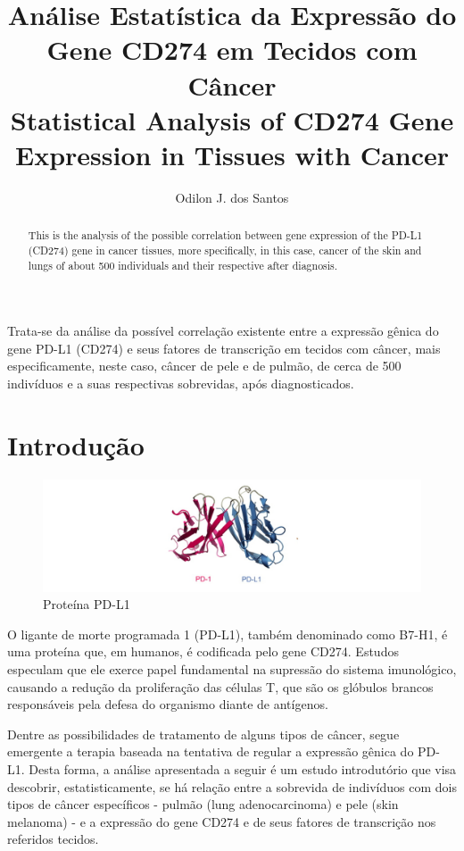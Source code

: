 \documentclass[a4paper,12pt]{article}
\title{Análise Estatística da Expressão do Gene CD274 em Tecidos com Câncer\\
Statistical Analysis of CD274 Gene Expression in Tissues with Cancer}
\author{Odilon J. dos Santos\inst{1}}
\begin{document}
 

\maketitle

\begin{abstract}
  This is the analysis of the possible correlation between gene expression
  of the PD-L1 (CD274) gene in cancer tissues, more specifically, in this case,
  cancer of the skin and lungs of about 500 individuals and their respective
  after diagnosis.
\end{abstract}
     
\begin{resumo} 
 Trata-se da análise da possível correlação existente entre a expressão gênica
 do gene PD-L1 (CD274) e seus fatores de transcrição em tecidos com câncer, mais especificamente, neste caso,
 câncer de pele e de pulmão, de cerca de 500 indivíduos e a suas respectivas 
 sobrevidas, após diagnosticados. 
\end{resumo}


\section{Introdução} \label{sec:firstpage}

\begin{figure}[h!]
\centering
\includegraphics[width=1 \textwidth]{pdl1.jpg}
\caption{Proteína PD-L1}
\label{fig:PD-L1}
\end{figure}

O ligante de morte programada 1 (PD-L1), também denominado como B7-H1, é uma
proteína que, em humanos, é codificada pelo gene CD274. Estudos especulam que 
ele exerce papel fundamental na supressão do sistema imunológico, causando a redução
da proliferação das células T, que são os glóbulos brancos responsáveis pela defesa
do organismo diante de antígenos.

Dentre as possibilidades de tratamento de alguns tipos de câncer, segue emergente
a terapia baseada na tentativa de regular a expressão gênica do PD-L1. Desta forma, 
a análise apresentada a seguir é um estudo introdutório que visa descobrir, estatisticamente,
 se há relação entre a sobrevida de indivíduos com dois tipos de câncer específicos -
 pulmão (lung adenocarcinoma) e pele (skin melanoma) - e a expressão do gene CD274 e de seus fatores de transcrição nos referidos tecidos.
\end{document}
